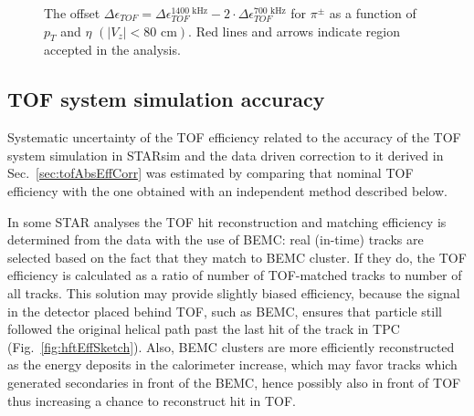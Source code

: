 \begin{figure}[H]
{	}%
	\caption[The difference $\Delta\epsilon_{ TOF} =\Delta\epsilon_{ TOF}^{1400\text{ kHz}}-2\cdot\Delta\epsilon_{ TOF}^{700\text{ kHz}}$ for $\pi^\pm$ as a function of $p_T$ and $\eta$ $\left(|V_z|<80\text{ cm}\right)$]{The offset $\Delta\epsilon_{ TOF} =\Delta\epsilon_{ TOF}^{1400\text{ kHz}}-2\cdot\Delta\epsilon_{ TOF}^{700\text{ kHz}}$ for $\pi^\pm$ as a function of $p_T$ and $\eta$ $\left(|V_z|<80\text{ cm}\right)$. Red lines and arrows indicate region accepted in the analysis.}
	\label{fig:systError2Dtof}
\end{figure}



\subsection{TOF system simulation accuracy}\label{subsec:tofAbsEffSystAndCorr}

Systematic uncertainty of the TOF efficiency related to the accuracy of the TOF system simulation in STARsim and the data driven correction to it derived in Sec.~\ref{sec:tofAbsEffCorr} was estimated by comparing that nominal TOF efficiency with the one obtained with an independent method described below.

In some STAR analyses the TOF hit reconstruction and matching efficiency is determined from the data with the use of BEMC: real (in-time) tracks are selected based on the fact that they match to BEMC cluster. If they do, the TOF efficiency is calculated as a ratio of number of TOF-matched tracks to number of all tracks. This solution may provide slightly biased efficiency, because the signal in the detector placed behind TOF, such as BEMC, ensures that particle still followed the original helical path past the last hit of the track in TPC (Fig.~\ref{fig:hftEffSketch}). Also, BEMC clusters are more efficiently reconstructed as the energy deposits in the calorimeter increase, which may favor tracks which generated secondaries in front of the BEMC, hence possibly also in front of TOF thus increasing a chance to reconstruct hit in TOF.

